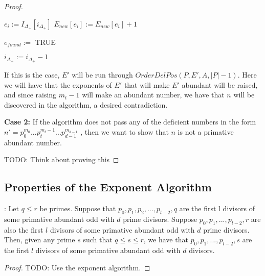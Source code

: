 \documentclass[../paper.tex]{subfiles}
\begin{document}
\begin{proof}
\begin{algorithmic}
		\STATE $e_i := I_{\Delta_{+}}[i_{\Delta_{+}}]$
		\STATE $E_{new}[e_i] := E_{new}[e_i] + 1$

			\STATE $e_{found} :=$ TRUE
		\ENDIF

	\STATE $i_{\Delta_{+}} :=  i_{\Delta_{+}} - 1$

	\ENDIF 

\ENDWHILE

\end{algorithmic}

If this is the case, $E'$ will be run through $OrderDelPos(P, E',
A, |P| - 1)$. Here we will have that the exponents of $E'$ that
will make $E'$ abundant will be raised, and since raising $m_t -1$
will make an abundant number, we have that $n$ will be discovered
in the algorithm, a desired contradiction.


\textbf{Case 2:}
  If the algorithm does not pass any of the deficient numbers in
the form $n' = p_0^{m_0}...p_{t}^{m_t - 1}...p_{d-1}^{m_{d-1}}$ , then 
we want to show that $n$ is not a primative abundant number. 

TODO: Think about proving this
\end{proof}

\subsection{Properties of the Exponent Algorithm}

\begin{theorem}[Property 1]

\end{theorem}

\begin{theorem}:
Let $q \leq r$ be primes. Suppose that $p_0, p_1, p_2, ..., 
p_{l-2}, q$ are the first l divisors of some primative abundant
odd with $d$ prime divisors. Suppose $p_0, p_1, ..., p_{l-2},r$ 
are also the first $l$ divisors of some primative abundant odd
with $d$ prime divisors. Then, given any prime $s$ such that $q \leq s 
\leq r$, we have that $p_0, p_1,..., p_{l-2}, s$ are the first $l$
divisors of some primative abundant odd with $d$ divisors.
\end{theorem}

\begin{proof}
  TODO: Use the exponent algorithm.
\end{proof}


\end{document}
